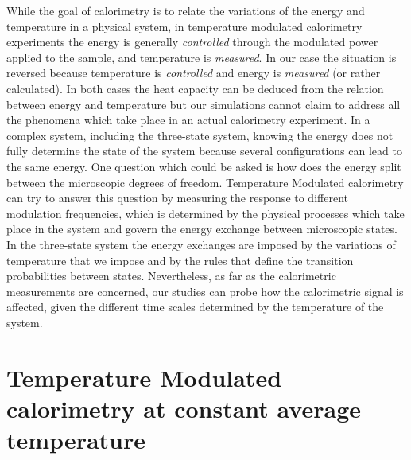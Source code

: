 \documentclass[pre,a4paper,twocolumn,superscriptaddress,%
floatfix]{revtex4}
\begin{document}
\smallskip
While the goal of calorimetry is to relate the variations of the energy and
temperature in a physical system, in temperature modulated calorimetry
experiments the energy is generally {\em controlled} through the modulated power
applied to the
sample, and temperature is {\em measured}. In our case the situation is
reversed because temperature is {\em controlled} and energy is {\em measured}
(or rather calculated). In both cases the heat capacity can be deduced from
the relation between energy and temperature but our simulations cannot claim
to address all the phenomena which take place in an actual calorimetry
experiment. In a complex system, including the three-state system, knowing the
energy does not fully determine the state of the system because several
configurations can lead to the same energy. One question which could be asked
is how does the energy split between the microscopic degrees of
freedom. Temperature Modulated calorimetry can try to answer this question by
measuring the 
response to different modulation frequencies, which is determined by the
physical processes which take place in the system and govern the energy
exchange between microscopic states. In the three-state system
the energy exchanges are imposed by the variations of temperature
that we impose and by the rules that define the transition probabilities
between states. Nevertheless, as far as the calorimetric measurements are
concerned, our studies can probe how the calorimetric signal is affected,
given the different time scales determined by the temperature of the system.

\section{Temperature Modulated calorimetry at constant average temperature}
\label{sec:constantt}
\end{document}
